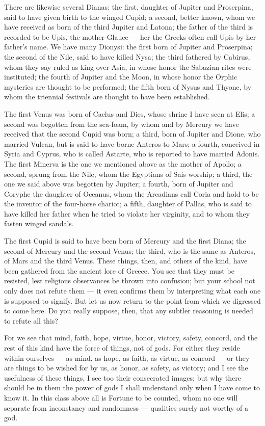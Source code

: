  There are likewise several Dianas: the first, daughter of Jupiter and Proserpina, said to have given birth to the winged Cupid; a second, better known, whom we have received as born of the third Jupiter and Latona; the father of the third is recorded to be Upis, the mother Glauce — her the Greeks often call Upis by her father's name. We have many Dionysi: the first born of Jupiter and Proserpina; the second of the Nile, said to have killed Nysa; the third fathered by Cabirus, whom they say ruled as king over Asia, in whose honor the Sabazian rites were instituted; the fourth of Jupiter and the Moon, in whose honor the Orphic mysteries are thought to be performed; the fifth born of Nysus and Thyone, by whom the triennial festivals are thought to have been established.

 The first Venus was born of Caelus and Dies, whose shrine I have seen at Elis; a second was begotten from the sea-foam, by whom and by Mercury we have received that the second Cupid was born; a third, born of Jupiter and Dione, who married Vulcan, but is said to have borne Anteros to Mars; a fourth, conceived in Syria and Cyprus, who is called Astarte, who is reported to have married Adonis. The first Minerva is the one we mentioned above as the mother of Apollo; a second, sprung from the Nile, whom the Egyptians of Sais worship; a third, the one we said above was begotten by Jupiter; a fourth, born of Jupiter and Coryphe the daughter of Oceanus, whom the Arcadians call Coria and hold to be the inventor of the four-horse chariot; a fifth, daughter of Pallas, who is said to have killed her father when he tried to violate her virginity, and to whom they fasten winged sandals.

 The first Cupid is said to have been born of Mercury and the first Diana; the second of Mercury and the second Venus; the third, who is the same as Anteros, of Mars and the third Venus. These things, then, and others of the kind, have been gathered from the ancient lore of Greece. You see that they must be resisted, lest religious observances be thrown into confusion; but your school not only does not refute them — it even confirms them by interpreting what each one is supposed to signify. But let us now return to the point from which we digressed to come here. Do you really suppose, then, that any subtler reasoning is needed to refute all this?

 For we see that mind, faith, hope, virtue, honor, victory, safety, concord, and the rest of this kind have the force of things, not of gods. For either they reside within ourselves — as mind, as hope, as faith, as virtue, as concord — or they are things to be wished for by us, as honor, as safety, as victory; and I see the usefulness of these things, I see too their consecrated images; but why there should be in them the power of gods I shall understand only when I have come to know it. In this class above all is Fortune to be counted, whom no one will separate from inconstancy and randomness — qualities surely not worthy of a god.

